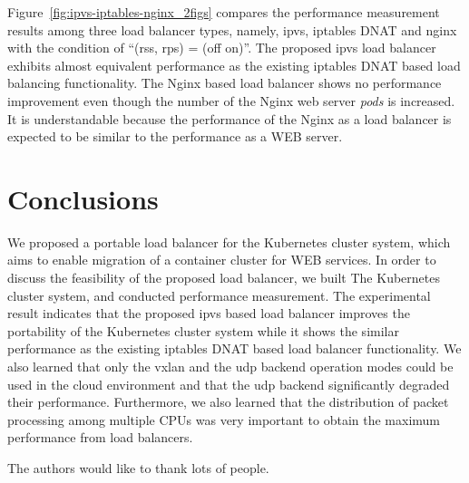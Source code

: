 Figure~\ref{fig:ipvs-iptables-nginx_2figs} compares the performance measurement results 
among three load balancer types, namely, ipvs, iptables DNAT and nginx 
with the condition of \enquote{(rss, rps) = (off on)}.
The proposed ipvs load balancer exhibits almost equivalent performance as the existing iptables 
DNAT based load balancing functionality. 
The Nginx based load balancer shows no performance improvement even though the number of the Nginx web server {\em pods} is increased.
It is understandable because the performance of the Nginx as a load balancer is expected to be similar to the performance as a WEB server.

\section{Conclusions}\label{Conclusions}

We proposed a portable load balancer for the Kubernetes cluster system, 
which aims to enable migration of a container cluster for WEB services.
In order to discuss the feasibility of the proposed load balancer, we built 
The Kubernetes cluster system, and conducted performance measurement.
The experimental result indicates that the proposed ipvs based load balancer improves the portability of 
the Kubernetes cluster system while it shows the similar performance as the existing iptables DNAT based load balancer functionality.
We also learned that only the vxlan and the udp backend operation modes could be used 
in the cloud environment and that the udp backend significantly degraded their performance.
Furthermore, we also learned that the distribution of packet processing among multiple CPUs was very important
to obtain the maximum performance from load balancers.



\begin{acks}
  The authors would like to thank lots of people.

\end{acks}
